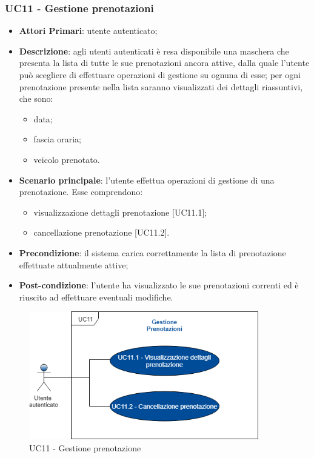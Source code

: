 \subsubsection{UC11 - Gestione prenotazioni}
\begin{itemize}
	\item \textbf{Attori Primari}: utente autenticato;
	\item \textbf{Descrizione}: agli utenti autenticati è resa disponibile una maschera che presenta la lista di tutte le sue prenotazioni ancora attive, dalla quale l'utente può scegliere di effettuare operazioni di gestione su ognuna di esse;
	per ogni prenotazione presente nella lista saranno visualizzati dei dettagli riassuntivi, che sono:
	\begin{itemize}
		\item data;
		\item fascia oraria;
		\item veicolo prenotato.
	\end{itemize}
	\item \textbf{Scenario principale}: l'utente effettua operazioni di gestione di una prenotazione. Esse comprendono:
	\begin{itemize}
		\item visualizzazione dettagli prenotazione [UC11.1];
		\item cancellazione prenotazione [UC11.2].
	\end{itemize}
	\item \textbf{Precondizione}: il sistema carica correttamente la lista di prenotazione effettuate attualmente attive;
	\item \textbf{Post-condizione}: l'utente ha visualizzato le sue prenotazioni correnti ed è riuscito ad effettuare eventuali modifiche.
\end{itemize} 
\begin{figure}[h]
	\includegraphics[width=10cm]{res/images/UC11Prenotazione.png}
	\centering
	\caption{UC11 - Gestione prenotazione}
\end{figure}
